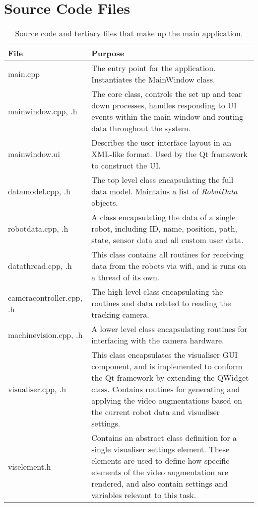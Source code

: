 
\chapter{Source Code Files} %

\label{AppendixSourceCodeFiles} %

\begin{longtable}{ l p{10cm} }
\caption[Application Code Files]{Source code and tertiary files that make up the main application.}\\
 File & Purpose\\ 
 \hline
 main.cpp & The entry point for the application. Instantiates the MainWindow class.\\
 mainwindow.cpp, .h & The core class, controls the set up and tear down processes, handles responding to UI events within the main window and routing data throughout the system.\\
 mainwindow.ui & Describes the user interface layout in an XML-like format. Used by the Qt framework to construct the UI.\\
 datamodel.cpp, .h & The top level class encapsulating the full data model. Maintains a list of \textit{RobotData} objects.\\
 robotdata.cpp, .h & A class encapsulating the data of a single robot, including ID, name, position, path, state, sensor data and all custom user data.\\
 datathread.cpp, .h & This class contains all routines for receiving data from the robots via wifi, and is runs on a thread of its own.\\
 cameracontroller.cpp, .h & The high level class encapsulating the routines and data related to reading the tracking camera.\\
 machinevision.cpp, .h & A lower level class encapsulating routines for interfacing with the camera hardware.\\
 visualiser.cpp, .h & This class encapsulates the visualiser GUI component, and is implemented to conform the Qt framework by extending the QWidget class. Contains routines for generating and applying the video augmentations based on the current robot data and visualiser settings.\\
 viselement.h & Contains an abstract class definition for a single visualiser settings element. These elements are used to define how specific elements of the video augmentation are rendered, and also contain settings and variables relevant to this task. \\

\end{longtable}
